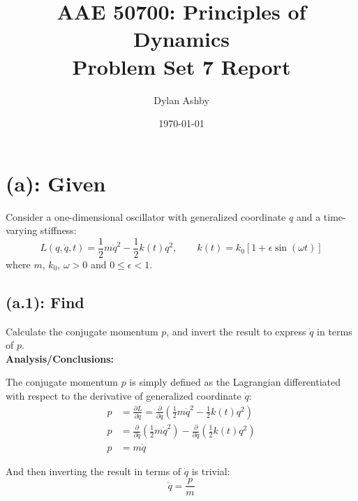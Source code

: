 \documentclass[titlepage]{article}
\title{AAE 50700: Principles of Dynamics\\ Problem Set 7 Report}
\author{Dylan Ashby}
\date{\today}
\begin{document}
\maketitle

\section*{(a): Given}

Consider a one-dimensional oscillator with generalized coordinate $q$ and a time-varying stiffness:
\begin{equation}
	L(q,\dot{q},t)=\frac{1}{2}m\dot{q}^2-\frac{1}{2}k(t)q^2,\qquad k(t)=k_0\left[1+\epsilon\sin\left(\omega t\right)\right]
	\label{eq:lagrangian}
\end{equation}
where $m$, $k_0$, $\omega>0$ and $0\leq\epsilon<1$.

\subsection*{(a.1): Find}

Calculate the conjugate momentum $p$, and invert the result to express $\dot{q}$ in terms of $p$.\\

\textbf{Analysis/Conclusions:}\\

\begin{mdframed}[linewidth=1pt, innertopmargin=10pt, innerbottommargin=10pt]
	The conjugate momentum $p$ is simply defined as the Lagrangian differentiated with respect to the derivative of generalized coordinate $\dot{q}$:
	\begin{equation}
		\begin{split}
			p&=\frac{\partial L}{\partial\dot{q}}=\frac{\partial}{\partial\dot{q}}\left(\frac{1}{2}m\dot{q}^2-\frac{1}{2}k(t)q^2\right) \\
			p&=\frac{\partial}{\partial\dot{q}}\left(\frac{1}{2}m\dot{q}^2\right)-\frac{\partial}{\partial\dot{q}}\left(\frac{1}{2}k(t)q^2\right) \\
			p&=m\dot{q}
		\end{split}
		\label{eq:momentum}
	\end{equation}
	
	And then inverting the result in terms of $\dot{q}$ is trivial:
	\begin{equation}
		\dot{q}=\frac{p}{m}
		\label{eq:qrate}
	\end{equation}
\end{mdframed}
\end{document}
